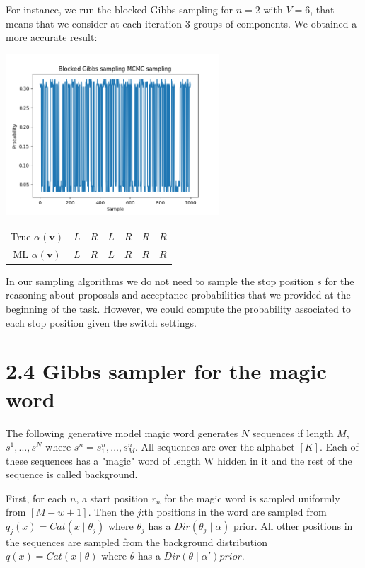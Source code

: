 \documentclass[]{article}
\begin{document}
For instance, we run the blocked Gibbs sampling for $n=2$ with $V=6$, that means that we consider at each iteration 3 groups of components. We obtained a more accurate result:
\begin{center}
	\includegraphics[height=6cm]{task3/V_6_T_6_N_10000_Blocked_Gibbs.png}
	\begin{tabular}{| c | c | c | c | c | c | c |}
		True $\alpha(\mathbf{v})$ & $L$ & $R$ & $L$ & $R$ & $R$ & $R$ \\
		ML $\alpha(\mathbf{v})$ & $L$ & $R$ & $L$ & $R$ & $R$ & $R$ \\
	\end{tabular}
\end{center}

In our sampling algorithms we do not need to sample the stop position $s$ for the reasoning about proposals and acceptance probabilities that we provided at the beginning of the task. However, we could compute the probability associated to each stop position given the switch settings. 

\newpage

\section*{2.4 Gibbs sampler for the magic word}

The following generative model magic word generates $N$ sequences if length $M$, $s^1, ..., s^N $ where $s^n = s_1^n, ... ,s_M^n $. All sequences are over the alphabet $[K]$. Each of these sequences has a "magic" word of length W hidden in it and the rest of the sequence is called background. 

First, for each $n$, a start position $r_n$ for the magic word is sampled uniformly from $[M-w+1]$. Then the $j$:th positions in the word are sampled from $q_j(x)=Cat(x \mid \theta_j)$ where $\theta_j$ has a $Dir( \theta_j \mid \alpha)$ prior. All other positions in the sequences are sampled from the background distribution $q(x) = Cat(x \mid \theta)$ where $\theta$ has a $Dir(\theta \mid \alpha') prior.$
\end{document}

